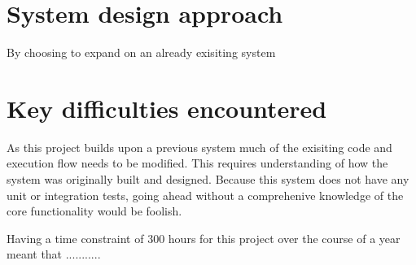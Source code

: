 \section{System design approach}
By choosing to expand on an already exisiting system


\section{Key difficulties encountered}
As this project builds upon a previous system much of the exisiting code and execution flow needs to be modified. This requires understanding of how the system was originally built and designed. Because this system does not have any unit or integration tests, going ahead without a comprehenive knowledge of the core functionality would be foolish.

Having a time constraint of 300 hours for this project over the course of a year meant that ...........